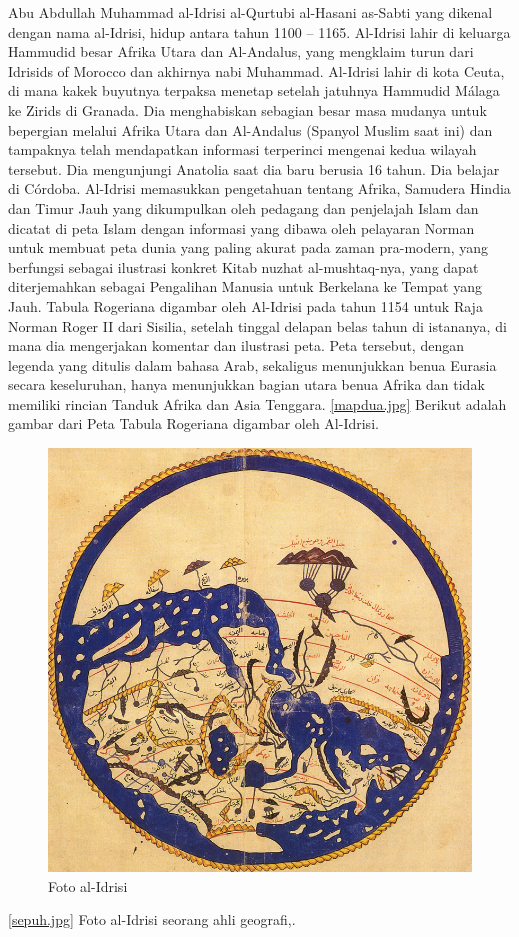 	Abu Abdullah Muhammad al-Idrisi al-Qurtubi al-Hasani as-Sabti yang dikenal dengan nama al-Idrisi, hidup antara tahun 1100 – 1165. Al-Idrisi lahir di keluarga Hammudid besar Afrika Utara dan Al-Andalus, yang mengklaim turun dari Idrisids of Morocco dan akhirnya nabi Muhammad. Al-Idrisi lahir di kota Ceuta, di mana kakek buyutnya terpaksa menetap setelah jatuhnya Hammudid Málaga ke Zirids di Granada. Dia menghabiskan sebagian besar masa mudanya untuk bepergian melalui Afrika Utara dan Al-Andalus (Spanyol Muslim saat ini) dan tampaknya telah mendapatkan informasi terperinci mengenai kedua wilayah tersebut. Dia mengunjungi Anatolia saat dia baru berusia 16 tahun. Dia belajar di Córdoba.
	Al-Idrisi memasukkan pengetahuan tentang Afrika, Samudera Hindia dan Timur Jauh yang dikumpulkan oleh pedagang dan penjelajah Islam dan dicatat di peta Islam dengan informasi yang dibawa oleh pelayaran Norman untuk membuat peta dunia yang paling akurat pada zaman pra-modern, yang berfungsi sebagai ilustrasi konkret Kitab nuzhat al-mushtaq-nya, yang dapat diterjemahkan sebagai Pengalihan Manusia untuk Berkelana ke Tempat yang Jauh. 
	Tabula Rogeriana digambar oleh Al-Idrisi pada tahun 1154 untuk Raja Norman Roger II dari Sisilia, setelah tinggal delapan belas tahun di istananya, di mana dia mengerjakan komentar dan ilustrasi peta. Peta tersebut, dengan legenda yang ditulis dalam bahasa Arab, sekaligus menunjukkan benua Eurasia secara keseluruhan, hanya menunjukkan bagian utara benua Afrika dan tidak memiliki rincian Tanduk Afrika dan Asia Tenggara.
	\ref{mapdua.jpg} Berikut adalah gambar dari Peta Tabula Rogeriana digambar oleh Al-Idrisi.
	\begin{figure} [ht]
	\centerline{\includegraphics[width=1\textwidth]{figures/petaawal.jpg}}
	\caption{Foto al-Idrisi}
	\end{figure}
	\ref{sepuh.jpg} Foto al-Idrisi seorang ahli geografi,.
	

